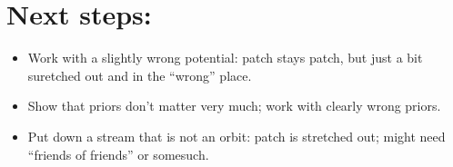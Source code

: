 \documentclass[12pt,a4paper,twoside]{article}
\begin{document}
\section{Next steps:}

\begin{itemize}
\item Work with a slightly wrong potential: patch stays patch, but just a bit suretched out and in the ``wrong'' place.

\item Show that priors don't matter very much; work with clearly wrong priors.

\item Put down a stream that is not an orbit: patch is stretched out; might need ``friends of friends'' or somesuch.

\end{itemize}
\end{document}

